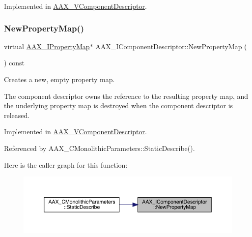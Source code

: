 Implemented in \mbox{\hyperlink{a01901_ac84695bd7c0161a2a0b29b9a3515189c}{A\+A\+X\+\_\+\+V\+Component\+Descriptor}}.

\mbox{\label{a01781_a0d7dd21daa8bc588d6a1145c3eb7ef98}} 
\subsubsection{\texorpdfstring{NewPropertyMap()}{NewPropertyMap()}}
{\footnotesize\ttfamily virtual \mbox{\hyperlink{a01869}{A\+A\+X\+\_\+\+I\+Property\+Map}}$\ast$ A\+A\+X\+\_\+\+I\+Component\+Descriptor\+::\+New\+Property\+Map (\begin{DoxyParamCaption}{ }\end{DoxyParamCaption}) const\hspace{0.3cm}{\ttfamily [pure virtual]}}



Creates a new, empty property map. 

The component descriptor owns the reference to the resulting property map, and the underlying property map is destroyed when the component descriptor is released. 

Implemented in \mbox{\hyperlink{a01901_ac4f19b39b69e84868adca243006a7fec}{A\+A\+X\+\_\+\+V\+Component\+Descriptor}}.



Referenced by A\+A\+X\+\_\+\+C\+Monolithic\+Parameters\+::\+Static\+Describe().

Here is the caller graph for this function\+:
\nopagebreak
\begin{figure}[H]
\begin{center}
\leavevmode
\includegraphics[width=350pt]{a01781_a0d7dd21daa8bc588d6a1145c3eb7ef98_icgraph}
\end{center}
\end{figure}
\mbox{\label{a01781_a107f2d11ba9165ef84162a76368f6ee6}} 
